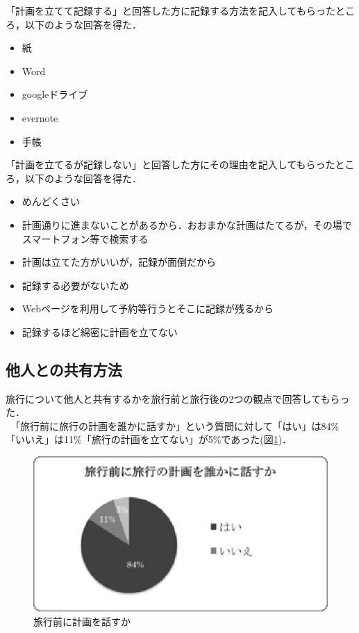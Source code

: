 \documentclass{funthesis}
\begin{document}
「計画を立てて記録する」と回答した方に記録する方法を記入してもらったところ，以下のような回答を得た．
\begin{itemize}
 \item 紙
 \item Word
 \item googleドライブ
 \item evernote
 \item 手帳
\end{itemize}


「計画を立てるが記録しない」と回答した方にその理由を記入してもらったところ，以下のような回答を得た．
\begin{itemize}
 \item めんどくさい
 \item 計画通りに進まないことがあるから．おおまかな計画はたてるが，その場でスマートフォン等で検索する
 \item 計画は立てた方がいいが，記録が面倒だから
 \item 記録する必要がないため
 \item Webページを利用して予約等行うとそこに記録が残るから
 \item 記録するほど綿密に計画を立てない
\end{itemize}


\subsection{他人との共有方法}

旅行について他人と共有するかを旅行前と旅行後の2つの観点で回答してもらった．\\
　「旅行前に旅行の計画を誰かに話すか」という質問に対して「はい」は84\%「いいえ」は11\%「旅行の計画を立てない」が5\%であった(図\ref{Lbeforetalktrip})．\\
\begin{figure}[htpb]
\begin{center}
\includegraphics[scale=0.65]{beforetalktrip.eps}
\end{center}
\caption{旅行前に計画を話すか}
\label{Lbeforetalktrip}
\end{figure}
\end{document}
